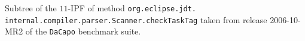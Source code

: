 \label{fig:CS-sched-eclipse} Subtree of the $11$-IPF of method {\tt org.eclipse.jdt.} {\tt internal.compiler.parser.Scanner.checkTaskTag} taken from release 2006-10-MR2 of the {\tt DaCapo} benchmark suite. %
